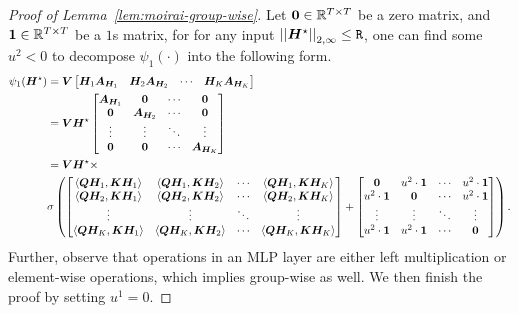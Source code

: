 \begin{proof}[Proof of Lemma~\ref{lem:moirai-group-wise}]
    Let $\bm{0} \in \mathbb{R}^{T \times T}$ be a zero matrix, and $\bm{1} \in \mathbb{R}^{T \times T}$ be a $1$s matrix, for for any input $\left\lvert \left\lvert\bm{H}^\star\right\rvert \right\rvert_{2, \infty} \leq \mathtt{R}$, one can find some $u^2 < 0$ to decompose $\psi_1(\cdot)$ into the following form.
    \begin{align*}
    \psi_1(\bm{H}^\star)
    &=
    \bm{V}
    \begin{bmatrix}
        \bm{H}_1 \bm{A}_{\bm{H}_1} & 
        \bm{H}_2 \bm{A}_{\bm{H}_2} &
        \cdots &
        \bm{H}_K \bm{A}_{\bm{H}_K}
    \end{bmatrix}
    \\
    &=
    \bm{V} 
    \bm{H}^\star
    \begin{bmatrix}
        \bm{A}_{\bm{H}_1} & \bm{0} & \cdots  & \bm{0} \\
        \bm{0} & \bm{A}_{\bm{H}_2} & \cdots  & \bm{0} \\
        \vdots & \vdots & \ddots & \vdots \\
        \bm{0} & \bm{0} & \cdots & \bm{A}_{\bm{H}_K}
    \end{bmatrix}
    \\
    &=
    \bm{V}
    \bm{H}^\star
    \times
    \\
    &\sigma
    \left(
    \begin{bmatrix}
        \Braket{\bm{Q} \bm{H}_1, \bm{K} \bm{H}_1} & \Braket{\bm{Q} \bm{H}_1, \bm{K} \bm{H}_2} & \cdots  & \Braket{\bm{Q} \bm{H}_1, \bm{K} \bm{H}_K} \\
        \Braket{\bm{Q} \bm{H}_2, \bm{K} \bm{H}_1} & \Braket{\bm{Q} \bm{H}_2, \bm{K} \bm{H}_2} & \cdots  & \Braket{\bm{Q} \bm{H}_2, \bm{K} \bm{H}_K} \\
        \vdots & \vdots & \ddots & \vdots \\
        \Braket{\bm{Q} \bm{H}_K, \bm{K} \bm{H}_1} & \Braket{\bm{Q} \bm{H}_K, \bm{K} \bm{H}_2} & \cdots & \Braket{\bm{Q} \bm{H}_K, \bm{K} \bm{H}_K}
    \end{bmatrix}
    +
    \begin{bmatrix}
        \bm{0} & u^2 \cdot \bm{1} & \cdots  & u^2 \cdot \bm{1} \\
        u^2 \cdot\bm{1} & \bm{0} & \cdots  & u^2 \cdot \bm{1}\\
        \vdots & \vdots & \ddots & \vdots \\
        u^2 \cdot\bm{1} & u^2\cdot \bm{1} & \cdots & \bm{0}
    \end{bmatrix}
    \right).
    \end{align*}
    Further, observe that operations in an MLP layer are either left multiplication or element-wise operations, which implies group-wise as well. 
    We then finish the proof by setting $u^1 = 0$.

\end{proof}


